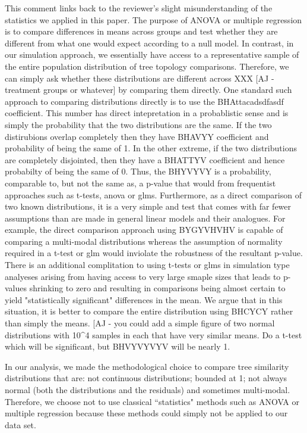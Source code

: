 \documentclass[11pt]{letter}
\begin{document}
\begin{letter}{}
This comment links back to the reviewer's slight misunderstanding of the statistics we applied in this paper. The purpose of ANOVA or multiple regression is to compare differences in means across groups and test whether they are different from what one would expect according to a null model. In contrast, in our simulation approach, we essentially have access to a representative sample of the entire population distribution of tree topology comparisons. Therefore, we can simply ask whether these distributions are different across XXX [AJ - treatment groups or whatever] by comparing them directly. One standard such approach to comparing distributions directly is to use the BHAttacadsdfasdf coefficient. This number has direct intepretation in a probablistic sense and is simply the probability that the two distributions are the same. If the two distirubions overlap completely then they have BHAVYY coefficient and probability of being the same of 1. In the other extreme, if the two distributions are completely disjointed, then they have a BHATTYV coefficient and hence probabilty of being the same of 0. Thus, the BHYVYVY is a probability, comparable to, but not the same as, a p-value that would from frequentist approaches such as t-tests, anova or glms. Furthermore, as a direct comparison of two known distributions, it is a very simple and test that comes with far fewer assumptions than are made in general linear models and their analogues. For example, the direct comparison approach using BYGYVHVHV is capable of comparing a multi-modal distributions whereas the assumption of normality required in a t-test or glm would inviolate the robustness of the resultant p-value. There is an additional complitation to using t-tests or glms in simulation type analyeses arising from having access to very large smaple sizes that leads to p-values shrinking to zero and resulting in comparisons being almost certain to yield "statistically significant" differences in the mean. We argue that in this situation, it is better to compare the entire distribution using BHCYCY rather than simply the means. [AJ - you could add a simple figure of two normal distributions with 10^4 samples in each that have very similar means. Do a t-test which will be significant, but BHVYVYVYV will be nearly 1.

In our analysis, we made the methodological choice to compare tree similarity distributions that are: not continuous distributions; bounded at 1; not always normal (both the distributions and the residuals) and sometimes multi-modal. Therefore, we choose not to use classical ``statistics" methods such as ANOVA or multiple regression because these methods could simply not be applied to our data set.


\end{letter}
\end{document}
